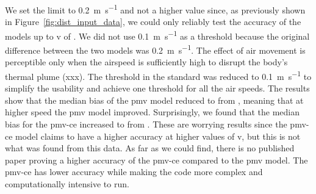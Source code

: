We set the limit to \qty{0.2}{\m\per\s} and not a higher value since, as previously shown in Figure~\ref{fig:dist_input_data}, we could only reliably test the accuracy of the models up to \ac{v} of .
We did not use \qty{0.1}{\m\per\s} as a threshold because the original difference between the two models was \qty{0.2}{\m\per\s}.
The effect of air movement is perceptible only when the airspeed is sufficiently high to disrupt the body's thermal plume (xxx).
The threshold in the standard was reduced to \qty{0.1}{\m\per\s} to simplify the usability and achieve one threshold for all the air speeds.
The results show that the median bias of the \ac{pmv} model reduced to  from , meaning that at higher speed the \ac{pmv} model improved.
Surprisingly, we found that the median bias for the \ac{pmv-ce} increased to  from .
These are worrying results since the \ac{pmv-ce} model claims to have a higher accuracy at higher values of \ac{v}, but this is not what was found from this data.
As far as we could find, there is no published paper proving a higher accuracy of the \ac{pmv-ce} compared to the \ac{pmv} model. 
The \ac{pmv-ce} has lower accuracy while making the code more complex and computationally intensive to run.

